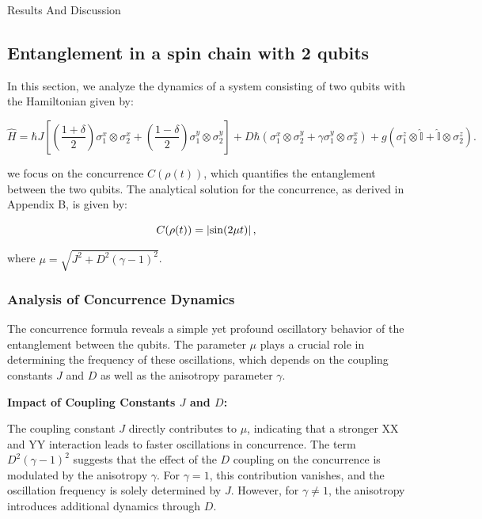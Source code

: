 Results And Discussion


\subsection{Entanglement in a spin chain with 2 qubits}
In this section, we analyze the dynamics of a 
system consisting of two qubits with the Hamiltonian given by:

\[
    \hat{H} =  \hbar J\left [ \left ( \frac{1 + \delta}{2} \right ) \sigma_1^x \otimes 
    \sigma_2^x  + \left ( \frac{1 - \delta}{2} \right ) \sigma_1^y \otimes \sigma_2^y \right ] + 
    D \hbar \left ( \sigma_1^x \otimes \sigma_2^y + \gamma \sigma_1^y \otimes \sigma_2^x  \right ) + g \left( 
    \sigma_1^z \otimes \mathbb{\hat{I}} + \mathbb{\hat{I}} \otimes \sigma_2^z  
\right).
\]

we focus on the concurrence $C(\rho(t))$, which quantifies the entanglement between 
the two qubits. The analytical solution for the concurrence, as derived in Appendix B, is given by:

\begin{equation*}
        C(\rho(t)) = \abs*{\sin(2 \mu t)},
\end{equation*}

where \(\mu = \sqrt{J^2 + D^2(\gamma-1)^2}\).

\subsubsection{Analysis of Concurrence Dynamics}

The concurrence formula reveals a simple yet profound oscillatory behavior of the entanglement between the qubits. The parameter \(\mu\) plays a crucial role in determining the frequency of these oscillations, which depends on the coupling constants \(J\) and \(D\) as well as the anisotropy parameter \(\gamma\).

\textbf{Impact of Coupling Constants \(J\) and \(D\):}

The coupling constant \(J\) directly contributes to \(\mu\), indicating that a stronger XX and YY interaction 
        leads to faster oscillations in concurrence. The term \(D^2(\gamma-1)^2\) suggests 
        that the effect of the \(D\) coupling on the concurrence 
        is modulated by the anisotropy \(\gamma\). For \(\gamma = 1\), 
        this contribution vanishes, and the oscillation frequency is 
        solely determined by \(J\). However, for \(\gamma \neq 1\), 
        the anisotropy introduces additional dynamics through \(D\).


